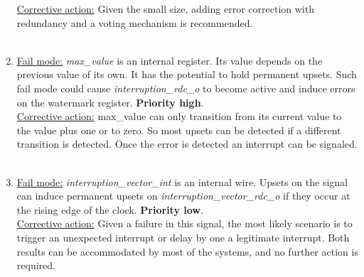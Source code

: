 \begin{enumerate}
\underline{Corrective action:} Given the small size, adding error correction with redundancy and a voting mechanism is recommended.\\
\\
\item \underline{Fail mode:} \textit{max\_value} is an internal register. Its value depends on the previous value of its own. It has the potential to hold permanent upsets. Such fail mode could cause  \textit{interruption\_rdc\_o} to become active and induce errors on the watermark register. \textbf{Priority high}.\\
\underline{Corrective action:} max\_value can only transition from its current value to the value plus one or to zero. So most upsets can be detected if a different transition is detected. Once the error is detected an interrupt can be signaled.\\
\\
\item \underline{Fail mode:} \textit{interruption\_vector\_int} is an internal wire. Upsets on the signal can induce permanent upsets on \textit{interruption\_vector\_rdc\_o} if they occur at the rising edge of the clock. \textbf{ Priority low}.\\
\underline{Corrective action:} 
Given a failure in this signal, the most likely scenario is to trigger an unexpected interrupt or delay by one a legitimate interrupt. Both results can be accommodated by most of the systems, and no further action is required.\\
\\
\end{enumerate}